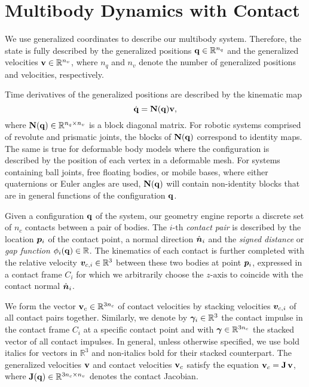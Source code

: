 \section{Multibody Dynamics with Contact}
\label{sec:multibody_dynamics_with_contact}

We use generalized coordinates to describe our multibody system. Therefore, the
state is fully described by the generalized positions
${\mathbf{q}}\in\mathbb{R}^{n_q}$ and the generalized velocities
${\mathbf{v}}\in\mathbb{R}^{n_v}$, where $n_q$ and $n_v$ denote the number of
generalized positions and velocities, respectively.

Time derivatives of the generalized positions are described by the kinematic map
\begin{equation}
	\dot{\mf{q}} = \mf{N}(\mf{q})\mf{v},
	\label{eq:kinematic_map}
\end{equation}
where ${\mathbf{N}}({\mathbf{q}})\in\mathbb{R}^{n_q\times n_v}$ is a block diagonal matrix.
For robotic systems comprised of revolute and prismatic joints, the blocks of
${\mathbf{N}}({\mathbf{q}})$ correspond to identity maps. The same is true for deformable
body models where the configuration is described by the position of each vertex
in a deformable mesh. For systems containing ball joints, free floating bodies,
or mobile bases, where either quaternions or Euler angles are used,
${\mathbf{N}}({\mathbf{q}})$ will contain non-identity blocks that are in general functions
of the configuration ${\mathbf{q}}$.

Given a configuration ${\mathbf{q}}$ of the system, our geometry engine reports a
discrete set of $n_c$ contacts between a pair of bodies. The $i\text{-th}$
\emph{contact pair} is described by the location ${\bm{p}}_i$ of the contact
point, a normal direction $\hat{{\bm{n}}}_i$ and the \emph{signed distance} or
\emph{gap function} $\phi_i({\mathbf{q}})\in\mathbb{R}$. The kinematics of each
contact is further completed with the relative velocity
${\bm{v}}_{c,i}\in\mathbb{R}^3$ between these two bodies at point ${\bm{p}}_i$,
expressed in a contact frame $C_i$ for which we arbitrarily choose the
$z\text{-axis}$ to coincide with the contact normal $\hat{{\bm{n}}}_i$.

We form the vector ${\mathbf{v}}_{c}\in\mathbb{R}^{3n_c}$ of contact velocities by
stacking velocities ${\bm{v}}_{c,i}$ of all contact pairs together. Similarly, we
denote by ${\bm\gamma}_i\in\mathbb{R}^3$ the contact impulse in the contact frame
$C_i$ at a specific contact point and with ${\bm\gamma}\in\mathbb{R}^{3n_c}$ the
stacked vector of all contact impulses. In general, unless otherwise specified,
we use bold italics for vectors in $\mathbb{R}^3$ and non-italics bold for their
stacked counterpart. The generalized velocities ${\mathbf{v}}$ and contact velocities
${\mathbf{v}}_c$ satisfy the equation ${\mathbf{v}}_c={\mathbf{J}}\,{\mathbf{v}}$, where
${\mathbf{J}}({\mathbf{q}})\in\mathbb{R}^{3n_c\times n_v}$ denotes the contact Jacobian.


